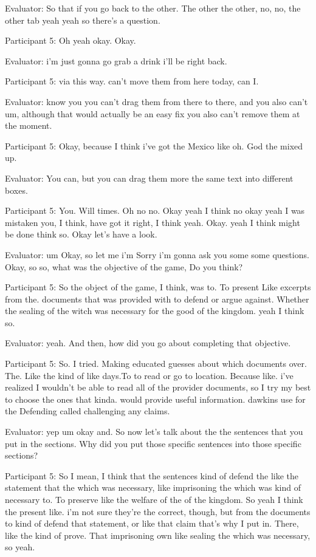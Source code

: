 \documentclass{l4proj}
\begin{document}
\begin{appendices}
Evaluator: So that if you go back to the other. The other the other, no, no, the other tab yeah yeah so there's a question.


Participant 5: Oh yeah okay. Okay.

Evaluator: i'm just gonna go grab a drink i'll be right back.

Participant 5: via this way. can't move them from here today, can I.

Evaluator: know you you can't drag them from there to there, and you also can't um, although that would actually be an easy fix you also can't remove them at the moment.

Participant 5: Okay, because I think i've got the Mexico like oh. God the mixed up.

Evaluator: You can, but you can drag them more the same text into different boxes.

Participant 5: You. Will times. Oh no no. Okay yeah I think no okay yeah I was mistaken you, I think, have got it right, I think yeah. Okay. yeah I think might be done think so. Okay let's have a look.

Evaluator: um Okay, so let me i'm Sorry i'm gonna ask you some some questions. Okay, so so, what was the objective of the game, Do you think?

Participant 5: So the object of the game, I think, was to. To present Like excerpts from the. documents that was provided with to defend or argue against. Whether the sealing of the witch was necessary for the good of the kingdom. yeah I think so.

Evaluator: yeah. And then, how did you go about completing that objective.

Participant 5: So. I tried. Making educated guesses about which documents over. The. Like the kind of like days.To to read or go to location. Because like. i've realized I wouldn't be able to read all of the provider documents, so I try my best to choose the ones that kinda. would provide useful information. dawkins use for the Defending called challenging any claims.

Evaluator: yep um okay and. So now let's talk about the the sentences that you put in the sections. Why did you put those specific sentences into those specific sections?




 

 

Participant 5: So I mean, I think that the sentences kind of defend the like the statement that the which was necessary, like imprisoning the which was kind of necessary to. To preserve like the welfare of the of the kingdom. So yeah I think the present like. i'm not sure they're the correct, though, but from the documents to kind of defend that statement, or like that claim that's why I put in. There, like the kind of prove. That imprisoning own like sealing the which was necessary, so yeah.


\end{appendices}
\end{document}
